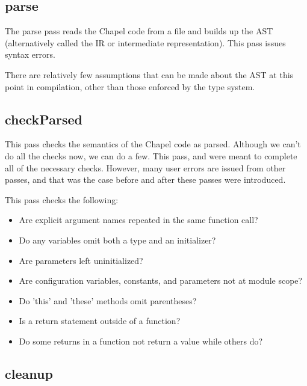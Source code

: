 \documentclass[10pt]{article}
\begin{document}
\subsection{parse}

The parse pass reads the Chapel code from a file and builds up the AST
(alternatively called the IR or intermediate representation).  This
pass issues syntax errors.

There are relatively few assumptions that can be made about the AST at
this point in compilation, other than those enforced by the type
system.

\subsection{checkParsed}

This pass checks the semantics of the Chapel code as parsed.  Although
we can't do all the checks now, we can do a few.  This pass,
 and  were meant to complete all
of the necessary checks.  However, many user errors are issued from
other passes, and that was the case before and after these passes were
introduced.

This pass checks the following:
\begin{itemize}
\item Are explicit argument names repeated in the same function call?
\item Do any variables omit both a type and an initializer?
\item Are parameters left uninitialized?
\item Are configuration variables, constants, and parameters not at module scope?
\item Do 'this' and 'these' methods omit parentheses?
\item Is a return statement outside of a function?
\item Do some returns in a function not return a value while others do?
\end{itemize}

\subsection{cleanup}
\end{document}
